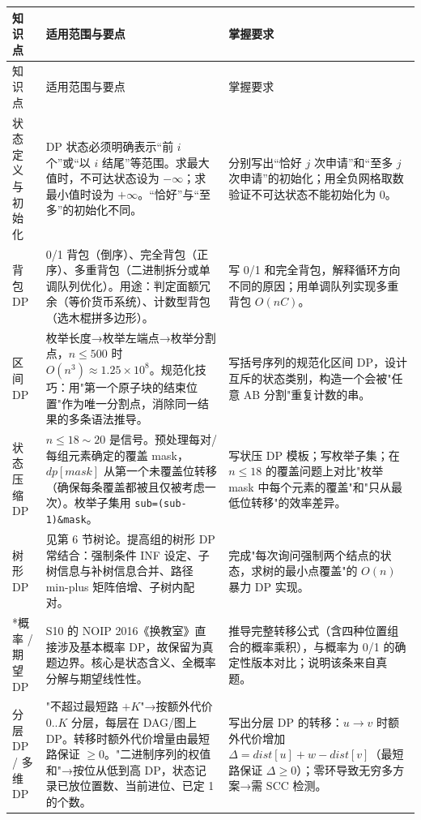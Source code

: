 \documentclass[a4paper,11pt]{article}
\newcommand{\code}[1]{\texttt{#1}}
\begin{document}
\begin{longtable}{L{2.4cm} L{7.5cm} L{6.8cm}}
\toprule
知识点 & 适用范围与要点 & 掌握要求 \\
\midrule
\endfirsthead
\toprule
知识点 & 适用范围与要点 & 掌握要求 \\
\midrule
\endhead
\endfoot
\bottomrule
\endlastfoot

状态定义与初始化
& DP 状态必须明确表示“前 $i$ 个”或“以 $i$ 结尾”等范围。求最大值时，不可达状态设为 $-\infty$；求最小值时设为 $+\infty$。“恰好”与“至多”的初始化不同。
& 分别写出“恰好 $j$ 次申请”和“至多 $j$ 次申请”的初始化；用全负网格取数验证不可达状态不能初始化为 0。\\[2mm]

背包 DP
& 0/1 背包（倒序）、完全背包（正序）、多重背包（二进制拆分或单调队列优化）。用途：判定面额冗余（等价货币系统）、计数型背包（选木棍拼多边形）。
& 写 0/1 和完全背包，解释循环方向不同的原因；用单调队列实现多重背包 $O(nC)$。\\[2mm]

区间 DP
& 枚举长度→枚举左端点→枚举分割点，$n\le500$ 时 $O(n^3)\approx1.25\times10^8$。规范化技巧：用"第一个原子块的结束位置"作为唯一分割点，消除同一结果的多条语法推导。
& 写括号序列的规范化区间 DP，设计互斥的状态类别，构造一个会被"任意 AB 分割"重复计数的串。\\[2mm]

状态压缩 DP
& $n\le18\sim20$ 是信号。预处理每对/每组元素确定的覆盖 mask，$dp[mask]$ 从第一个未覆盖位转移（确保每条覆盖都被且仅被考虑一次）。枚举子集用 \code{sub=(sub-1)\&mask}。
& 写状压 DP 模板；写枚举子集；在 $n\le18$ 的覆盖问题上对比"枚举 mask 中每个元素的覆盖"和"只从最低位转移"的效率差异。\\[2mm]

树形 DP
& 见第 6 节树论。提高组的树形 DP 常结合：强制条件 INF 设定、子树信息与补树信息合并、路径 min-plus 矩阵倍增、子树内配对。
& 完成"每次询问强制两个结点的状态，求树的最小点覆盖"的 $O(n)$ 暴力 DP 实现。\\[2mm]

*概率 / 期望 DP
& S10 的 NOIP 2016《换教室》直接涉及基本概率 DP，故保留为真题边界。核心是状态含义、全概率分解与期望线性性。
& 推导完整转移公式（含四种位置组合的概率乘积），与概率为 0/1 的确定性版本对比；说明该条来自真题。\\[2mm]

分层 DP / 多维 DP
& "不超过最短路 $+K$"→按额外代价 $0..K$ 分层，每层在 DAG/图上 DP。转移时额外代价增量由最短路保证 $\ge0$。"二进制序列的权值和"→按位从低到高 DP，状态记录已放位置数、当前进位、已定 1 的个数。
& 写出分层 DP 的转移：$u\to v$ 时额外代价增加 $\Delta = dist[u]+w - dist[v]$（最短路保证 $\Delta\ge0$）；零环导致无穷多方案→需 SCC 检测。\\[2mm]


\end{longtable}
\end{document}
